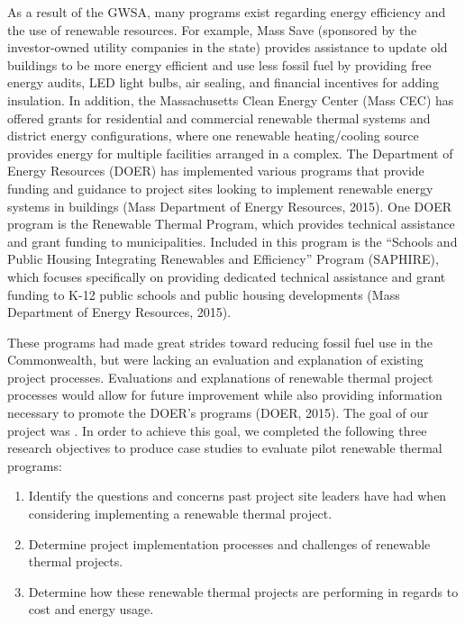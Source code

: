 \par As a result of the GWSA, many programs exist regarding energy efficiency and the use of renewable resources. For example, Mass Save (sponsored by the investor-owned utility companies in the state) provides assistance to update old buildings to be more energy efficient and use less fossil fuel by providing free energy audits, LED light bulbs, air sealing, and financial incentives for adding insulation. In addition, the Massachusetts Clean Energy Center (Mass CEC) has offered grants for residential and commercial renewable thermal systems and district energy configurations, where one renewable heating/cooling source provides energy for multiple facilities arranged in a complex. The Department of Energy Resources (DOER) has implemented various programs that provide funding and guidance to project sites looking to implement renewable energy systems in buildings (Mass Department of Energy Resources, 2015). One DOER program is the Renewable Thermal Program, which provides technical assistance and grant funding to municipalities. Included in this program is the “Schools and Public Housing Integrating Renewables and Efficiency” Program (SAPHIRE), which focuses specifically on providing dedicated technical assistance and grant funding to K-12 public schools and public housing developments (Mass Department of Energy Resources, 2015).
\par These programs had made great strides toward reducing fossil fuel use in the Commonwealth, but were lacking an evaluation and explanation of existing project processes. Evaluations and explanations of renewable thermal project processes would allow for future improvement while also providing information necessary to promote the DOER's programs (DOER, 2015). The goal of our project was \goal. In order to achieve this goal, we completed the following three research objectives to produce case studies to evaluate pilot renewable thermal programs:
\begin{enumerate}
  \item{Identify the questions and concerns past project site leaders have had when considering implementing a renewable thermal project.}
  \item{Determine project implementation processes and challenges of renewable thermal projects.}
  \item{Determine how these renewable thermal projects are performing in regards to cost and energy usage.}
\end{enumerate}

